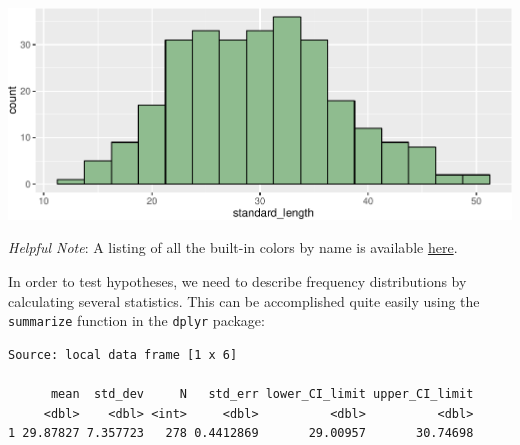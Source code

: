 \documentclass[twoside, 12pt]{article}
\newenvironment{Shaded}{\begin{snugshade}}{\end{snugshade}}
\newcommand{\KeywordTok}[1]{\textcolor[rgb]{0.13,0.29,0.53}{\textbf{{#1}}}}
\newcommand{\DataTypeTok}[1]{\textcolor[rgb]{0.13,0.29,0.53}{{#1}}}
\newcommand{\DecValTok}[1]{\textcolor[rgb]{0.00,0.00,0.81}{{#1}}}
\newcommand{\FloatTok}[1]{\textcolor[rgb]{0.00,0.00,0.81}{{#1}}}
\newcommand{\StringTok}[1]{\textcolor[rgb]{0.31,0.60,0.02}{{#1}}}
\newcommand{\NormalTok}[1]{{#1}}
\begin{document}
\includegraphics{skeleton_files/figure-latex/unnamed-chunk-21-1.pdf}

\emph{Helpful Note}: A listing of all the built-in colors by name is
available
\href{http://www.stat.columbia.edu/~tzheng/files/Rcolor.pdf}{here}.

In order to test hypotheses, we need to describe frequency distributions
by calculating several statistics. This can be accomplished quite easily
using the \texttt{summarize} function in the \texttt{dplyr} package:

\begin{Shaded}
\end{Shaded}

\begin{Verbatim}[frame=single]
Source: local data frame [1 x 6]

      mean  std_dev     N   std_err lower_CI_limit upper_CI_limit
     <dbl>    <dbl> <int>     <dbl>          <dbl>          <dbl>
1 29.87827 7.357723   278 0.4412869       29.00957       30.74698
\end{Verbatim}
\end{document}
